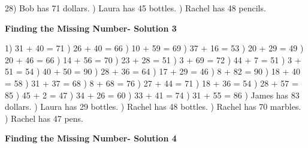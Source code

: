 \documentclass{article}%
\begin{document}
28) Bob has 71 dollars.%
) Laura has 45 bottles.%
) Rachel has 48 pencils.%
\newline%
\newpage%
\large%
\begin{center}%
\textbf{Finding the Missing Number- Solution 3}%
\newline%
\end{center} \normalsize%
1) 31 + 40 = 71%
) 26 + 40 = 66%
) 10 + 59 = 69%
) 37 + 16 = 53%
) 20 + 29 = 49%
) 20 + 46 = 66%
) 14 + 56 = 70%
) 23 + 28 = 51%
) 3 + 69 = 72%
) 44 + 7 = 51%
) 3 + 51 = 54%
) 40 + 50 = 90%
) 28 + 36 = 64%
) 17 + 29 = 46%
) 8 + 82 = 90%
) 18 + 40 = 58%
) 31 + 37 = 68%
) 8 + 68 = 76%
) 27 + 44 = 71%
) 18 + 36 = 54%
) 28 + 57 = 85%
) 45 + 2 = 47%
) 34 + 26 = 60%
) 33 + 41 = 74%
) 31 + 55 = 86%
) James has 83 dollars.%
) Laura has 29 bottles.%
) Rachel has 48 bottles.%
) Rachel has 70 marbles.%
) Rachel has 47 pens.%
\newline%
\newpage%
\large%
\begin{center}%
\textbf{Finding the Missing Number- Solution 4}%
\newline%
\end{center} \normalsize%
\end{document}
